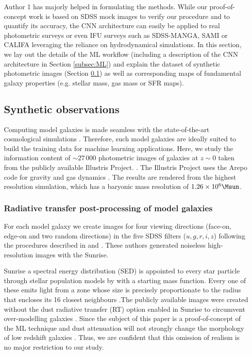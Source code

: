 \documentclass[conference]{IEEEtran}
\begin{document}
Author 1 has majorly helped in formulating the methods. While our proof-of-concept work is based on SDSS mock images to verify our procedure and to quantify its accuracy, the CNN architecture can easily be applied to real photometric surveys or even IFU surveys such as SDSS-MANGA, SAMI or CALIFA leveraging the reliance on hydrodynamical simulations.  In this section, we lay out the details of the ML workflow (including a description of the CNN architecture in Section \ref{subsec:ML}) and explain the dataset of synthetic photometric images (Section \ref{subsec:sdss}) as well as corresponding maps of fundamental galaxy properties (e.g. stellar mass, gas mass or SFR maps).


\subsection{Synthetic observations} \label{subsec:sdss}

Computing model galaxies is made seamless with the state-of-the-art cosmological simulations \citep[e.g.][]{Vogelsberger2014,Schaye2015,Wang2015,Dolag2016,Hopkins2018,Pillepich2018,Buck2019d,Buck2021}. Therefore, such model galaxies are ideally suited to build the training data for machine learning applications. Here, we study the information content of $\sim27\,000$ photometric images of galaxies at $z \sim 0$ taken from the publicly available Illustris Project. \citep[\url{www.illustris-project.org/data}][]{Vogelsberger2014}. The Illustris Project uses the Arepo code for gravity and gas dynamics \citep{Springel2010}. The results are rendered from the highest resolution simulation, which has a baryonic mass resolution of $1.26\times10^6\Msun$. 

\subsubsection{Radiative transfer post-processing of model galaxies}

For each model galaxy we create images for four viewing directions (face-on, edge-on and two random directions) in the five SDSS filters ($u,g,r,i,z$) following the procedures described in \cite{Torrey2015} and \cite{Snyder2015}. These authors generated noiseless high-resolution images with the {\sc Sunrise}. 

{\sc Sunrise} a spectral energy distribution (SED) is appointed to every star particle through stellar population models by  with a \cite{Chabrier2003} starting mass function. Every one of these  emits light from a zone whose size is precisely proportionate to the radius that encloses its 16 closest neighbours \citep [see][for further information] {Torrey2015}.The publicly available images were created without the dust radiative transfer (RT) option enabled in {\sc Sunrise} to circumvent over-modelling galaxies \citep[see][for more details]{Snyder2015}. Since the subject of this paper is a proof-of-concept of the ML technique and dust attenuation will not strongly change the morphology of low redshift galaxies \citep[but see e.g.][for the effect of dust on high redshift star forming galaxies]{Buck2017}. Thus, we are confident that this omission of realism is no major restriction to our study.
\end{document}
